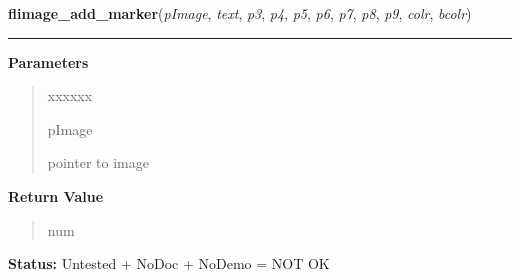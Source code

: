 \hspace{.8\funcindent}\begin{boxedminipage}{\funcwidth}

    \raggedright \textbf{flimage\_add\_marker}(\textit{pImage}, \textit{text}, \textit{p3}, \textit{p4}, \textit{p5}, \textit{p6}, \textit{p7}, \textit{p8}, \textit{p9}, \textit{colr}, \textit{bcolr})

    \vspace{-1.5ex}

    \rule{\textwidth}{0.5\fboxrule}
\setlength{\parskip}{2ex}
\setlength{\parskip}{1ex}
      \textbf{Parameters}
      \vspace{-1ex}

      \begin{quote}
        \begin{Ventry}{xxxxxx}

          \item[pImage]

          pointer to image

        \end{Ventry}

      \end{quote}

      \textbf{Return Value}
    \vspace{-1ex}

      \begin{quote}
      num

      \end{quote}

\textbf{Status:} Untested + NoDoc + NoDemo = NOT OK



    \end{boxedminipage}

    \label{xformslib:library:flimage_add_marker_struct}

    \vspace{0.5ex}

